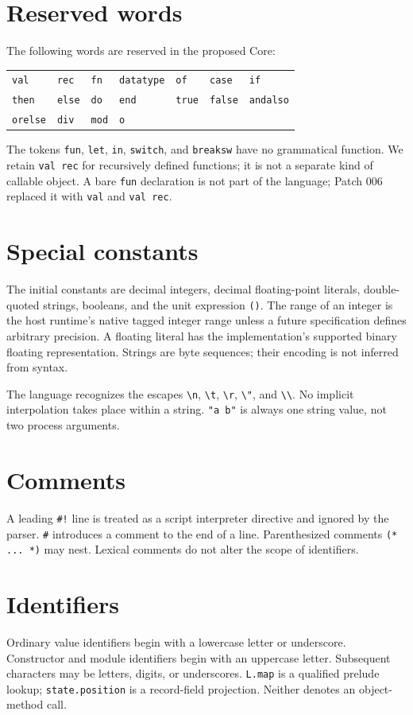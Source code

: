 \documentclass[11pt,oneside,openany]{book}
\newcommand{\kw}[1]{\texttt{#1}}
\begin{document}
\section{Reserved words}
The following words are reserved in the proposed Core:
\begin{center}
\begin{tabular}{lllllll}
\kw{val}&\kw{rec}&\kw{fn}&\kw{datatype}&\kw{of}&\kw{case}&\kw{if}\\
\kw{then}&\kw{else}&\kw{do}&\kw{end}&\kw{true}&\kw{false}&\kw{andalso}\\
\kw{orelse}&\kw{div}&\kw{mod}&\kw{o}&&&
\end{tabular}
\end{center}
The tokens \kw{fun}, \kw{let}, \kw{in}, \kw{switch}, and \kw{breaksw} have no grammatical function. We retain \kw{val rec} for recursively defined functions; it is not a separate kind of callable object. A bare \kw{fun} declaration is not part of the language; Patch 006 replaced it with \kw{val} and \kw{val rec}.

\section{Special constants}
The initial constants are decimal integers, decimal floating-point literals, double-quoted strings, booleans, and the unit expression \kw{()}. The range of an integer is the host runtime's native tagged integer range unless a future specification defines arbitrary precision. A floating literal has the implementation's supported binary floating representation. Strings are byte sequences; their encoding is not inferred from syntax.

The language recognizes the escapes \verb|\n|, \verb|\t|, \verb|\r|, \verb|\"|, and \verb|\\|. No implicit interpolation takes place within a string. \kw{"a b"} is always one string value, not two process arguments.

\section{Comments}
A leading \kw{\#!} line is treated as a script interpreter directive and ignored by the parser. \kw{\#} introduces a comment to the end of a line. Parenthesized comments \kw{(* ... *)} may nest. Lexical comments do not alter the scope of identifiers.

\section{Identifiers}
Ordinary value identifiers begin with a lowercase letter or underscore. Constructor and module identifiers begin with an uppercase letter. Subsequent characters may be letters, digits, or underscores. \kw{L.map} is a qualified prelude lookup; \kw{state.position} is a record-field projection. Neither denotes an object-method call.
\end{document}
